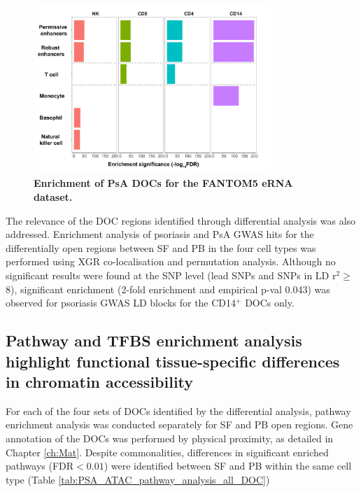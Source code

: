 \begin{figure}[htbp]
\centering
\includegraphics[width=0.8\textwidth]{./Results3/pdfs/ATAC_PsA_FANTOM_enhancer_enrichment_all_cell_types}
\caption[Enrichment of PsA DOCs for the FANTOM5 eRNA dataset]{\textbf{Enrichment of PsA DOCs for the FANTOM5 eRNA dataset.}  }
\label{fig:PSA_FANTOM}
\end{figure}



 
The relevance of the DOC regions identified through differential analysis was also addressed. Enrichment analysis of psoriasis and PsA GWAS hits for the differentially open regions between SF and PB in the four cell types was performed using XGR co-localisation and permutation analysis. Although no significant results were found at the SNP level (lead SNPs and SNPs in LD r$^2$$\geq$8), significant enrichment (2-fold enrichment and empirical p-val 0.043) was observed for psoriasis GWAS LD blocks for the CD14$^+$ DOCs only.




\subsection{Pathway and TFBS enrichment analysis highlight functional tissue-specific differences in chromatin accessibility}

For each of the four sets of DOCs identified by the differential analysis, pathway enrichment analysis was conducted separately for SF and PB open regions. Gene annotation of the DOCs was performed by physical proximity, as detailed in Chapter \ref{ch:Mat}. Despite commonalities, differences in significant enriched pathways (FDR$<0.01$) were identified between SF and PB within the same cell type (Table \ref{tab:PSA_ATAC_pathway_analysis_all_DOC})


